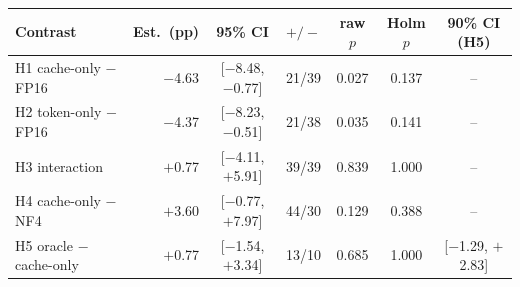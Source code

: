 \begin{tabular}{lrccccc}
\toprule
Contrast & Est.\ (pp) & 95\% CI & $+/-$ & raw $p$ & Holm $p$ & 90\% CI (H5) \\
\midrule
H1 cache-only $-$ FP16 & $-$4.63 & [$-$8.48, $-$0.77] & 21/39 & 0.027 & 0.137 & -- \\
H2 token-only $-$ FP16 & $-$4.37 & [$-$8.23, $-$0.51] & 21/38 & 0.035 & 0.141 & -- \\
H3 interaction & $+$0.77 & [$-$4.11, $+$5.91] & 39/39 & 0.839 & 1.000 & -- \\
H4 cache-only $-$ NF4 & $+$3.60 & [$-$0.77, $+$7.97] & 44/30 & 0.129 & 0.388 & -- \\
H5 oracle $-$ cache-only & $+$0.77 & [$-$1.54, $+$3.34] & 13/10 & 0.685 & 1.000 & [$-$1.29, $+$2.83] \\
\bottomrule
\end{tabular}
